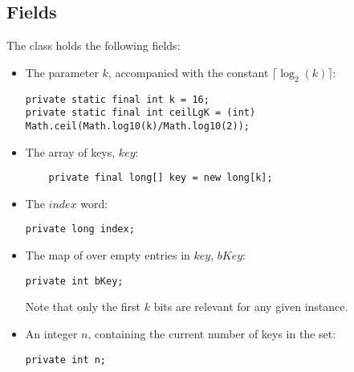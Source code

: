 \subsection{Fields}
The class holds the following fields:
\begin{itemize}
    \item
    The parameter $k$, accompanied with the constant $\lceil \log_2(k) \rceil$:
    \begin{lstlisting}
private static final int k = 16;
private static final int ceilLgK = (int) Math.ceil(Math.log10(k)/Math.log10(2));
    \end{lstlisting}

    \item
    The array of keys, $key$:
    \begin{lstlisting}
    private final long[] key = new long[k];
    \end{lstlisting}
    
    \item
    The $index$ word:
    \begin{lstlisting}
private long index;
    \end{lstlisting}

    \item
    The map of over empty entries in $key$, $bKey$:
    \begin{lstlisting}
private int bKey;
    \end{lstlisting}
    Note that only the first $k$ bits are relevant for any given instance.
    
    \item
    An integer $n$, containing the current number of keys in the set:
    \begin{lstlisting}
private int n;
    \end{lstlisting}
\end{itemize}

